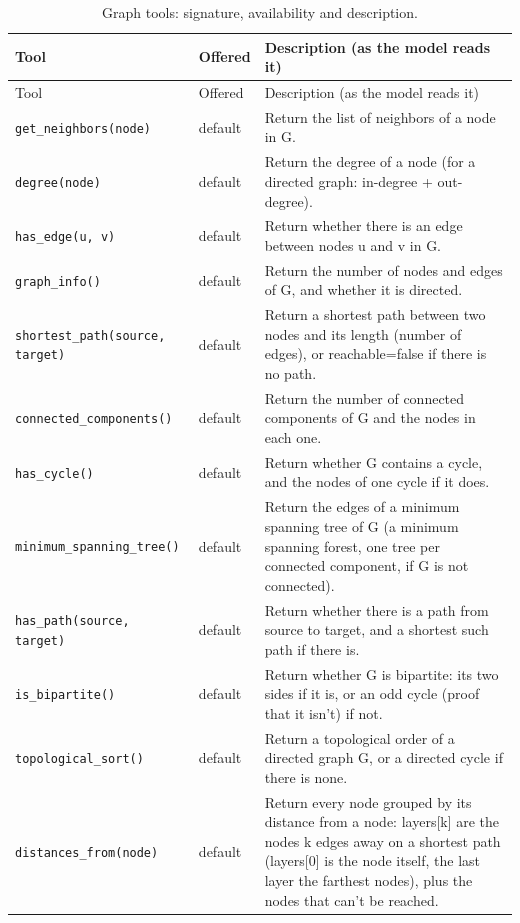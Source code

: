 {\small
\begin{longtable}{>{\raggedright\arraybackslash}p{4.4cm} l >{\raggedright\arraybackslash}p{8.2cm}}
  \caption{Graph tools: signature, availability and description.}\label{tab:tools}\\
  \toprule
  Tool & Offered & Description (as the model reads it) \\
  \midrule
  \endfirsthead
  \toprule
  Tool & Offered & Description (as the model reads it) \\
  \midrule
  \endhead
  \bottomrule
  \endfoot
    \texttt{get\_neighbors(node)} & default & Return the list of neighbors of a node in G. \\
    \texttt{degree(node)} & default & Return the degree of a node (for a directed graph: in-degree + out-degree). \\
    \texttt{has\_edge(u, v)} & default & Return whether there is an edge between nodes u and v in G. \\
    \texttt{graph\_info()} & default & Return the number of nodes and edges of G, and whether it is directed. \\
    \texttt{shortest\_path(source, target)} & default & Return a shortest path between two nodes and its length (number of edges), or reachable=false if there is no path. \\
    \texttt{connected\_components()} & default & Return the number of connected components of G and the nodes in each one. \\
    \texttt{has\_cycle()} & default & Return whether G contains a cycle, and the nodes of one cycle if it does. \\
    \texttt{minimum\_spanning\_tree()} & default & Return the edges of a minimum spanning tree of G (a minimum spanning forest, one tree per connected component, if G is not connected). \\
    \texttt{has\_path(source, target)} & default & Return whether there is a path from source to target, and a shortest such path if there is. \\
    \texttt{is\_bipartite()} & default & Return whether G is bipartite: its two sides if it is, or an odd cycle (proof that it isn't) if not. \\
    \texttt{topological\_sort()} & default & Return a topological order of a directed graph G, or a directed cycle if there is none. \\
    \texttt{distances\_from(node)} & default & Return every node grouped by its distance from a node: layers[k] are the nodes k edges away on a shortest path (layers[0] is the node itself, the last layer the farthest nodes), plus the nodes that can't be reached. \\

\end{longtable}}
